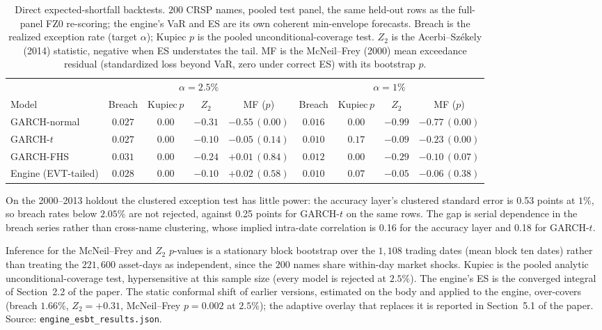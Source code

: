 \documentclass[11pt]{article}
\begin{document}
\begin{table}[t]
\centering
\begin{threeparttable}
\caption{Direct expected-shortfall backtests. $200$ CRSP names, pooled test
panel, the same held-out rows as the full-panel FZ0 re-scoring; the engine's
VaR and ES are its own coherent min-envelope forecasts. Breach is the realized
exception rate (target $\alpha$); Kupiec $p$ is the pooled unconditional-coverage
test. $Z_2$ is the Acerbi--Sz\'ekely (2014) statistic, negative when ES
understates the tail. MF is the McNeil--Frey (2000) mean exceedance residual
(standardized loss beyond VaR, zero under correct ES) with its bootstrap $p$.}
\label{tab:esbt}
\small\setlength{\tabcolsep}{5pt}
\begin{tabular}{lcccc|cccc}
\toprule
 & \multicolumn{4}{c}{$\alpha=2.5\%$} & \multicolumn{4}{c}{$\alpha=1\%$}\\
\cmidrule(lr){2-5}\cmidrule(lr){6-9}
Model & Breach & Kupiec\,$p$ & $Z_2$ & MF ($p$) & Breach & Kupiec\,$p$ & $Z_2$ & MF ($p$) \\
\midrule
GARCH-normal & $0.027$ & $0.00$ & $-0.31$ & $-0.55\,(0.00)$ & $0.016$ & $0.00$ & $-0.99$ & $-0.77\,(0.00)$ \\
GARCH-$t$ & $0.027$ & $0.00$ & $\mathbf{-0.10}$ & $-0.05\,(0.14)$ & $0.010$ & $\mathbf{0.17}$ & $-0.09$ & $-0.23\,(0.00)$ \\
GARCH-FHS & $0.031$ & $0.00$ & $-0.24$ & $\mathbf{+0.01\,(0.84)}$ & $0.012$ & $0.00$ & $-0.29$ & $-0.10\,(0.07)$ \\
Engine (EVT-tailed) & $0.028$ & $0.00$ & $\mathbf{-0.10}$ & $+0.02\,(0.58)$ & $0.010$ & $\mathbf{0.07}$ & $\mathbf{-0.05}$ & $\mathbf{-0.06\,(0.38)}$ \\
\bottomrule
\end{tabular}
\begin{tablenotes}\footnotesize
\item On the 2000--2013 holdout the clustered exception test has little power: the accuracy layer's clustered standard error is 0.53 points at $1\%$, so breach rates below $2.05\%$ are not rejected, against 0.25 points for GARCH-$t$ on the same rows. The gap is serial dependence in the breach series rather than cross-name clustering, whose implied intra-date correlation is 0.16 for the accuracy layer and 0.18 for GARCH-$t$.
\item Inference for the McNeil--Frey and $Z_2$ $p$-values is a stationary block
bootstrap over the $1{,}108$ trading dates (mean block ten dates) rather than
treating the $221{,}600$ asset-days as independent, since the $200$ names share
within-day market shocks. Kupiec is the pooled analytic unconditional-coverage
test, hypersensitive at this sample size (every model is rejected at $2.5\%$).
The engine's ES is the converged integral of Section~2.2 of the paper. The static conformal
shift of earlier versions, estimated on the body and applied to the engine, over-covers
(breach $1.66\%$, $Z_2=+0.31$, McNeil--Frey $p=0.002$ at $2.5\%$); the adaptive overlay that
replaces it is reported in Section~5.1 of the paper. Source: \texttt{engine\_esbt\_results.json}.
\end{tablenotes}
\end{threeparttable}
\end{table}
\end{document}
